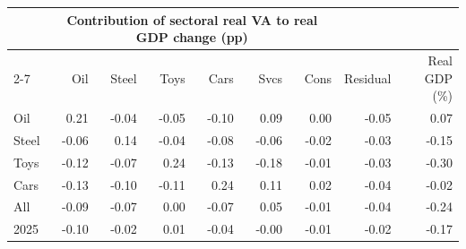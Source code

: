 \begin{tabular}{lrrrrrrrr}
\toprule
 & \multicolumn{6}{c}{Contribution of sectoral real VA to real GDP change (pp)} & & \\
\cmidrule(lr){2-7}
 & Oil & Steel & Toys & Cars & Svcs & Cons & Residual & Real GDP (\%) \\
\midrule
Oil & 0.21 & -0.04 & -0.05 & -0.10 & 0.09 & 0.00 & -0.05 & 0.07 \\
Steel & -0.06 & 0.14 & -0.04 & -0.08 & -0.06 & -0.02 & -0.03 & -0.15 \\
Toys & -0.12 & -0.07 & 0.24 & -0.13 & -0.18 & -0.01 & -0.03 & -0.30 \\
Cars & -0.13 & -0.10 & -0.11 & 0.24 & 0.11 & 0.02 & -0.04 & -0.02 \\
All & -0.09 & -0.07 & 0.00 & -0.07 & 0.05 & -0.01 & -0.04 & -0.24 \\
2025 & -0.10 & -0.02 & 0.01 & -0.04 & -0.00 & -0.01 & -0.02 & -0.17 \\
\bottomrule
\end{tabular}
